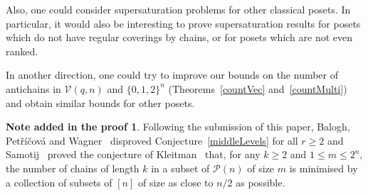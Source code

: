 \documentclass[11 pt]{article}
\theoremstyle{definition}
\newtheorem*{noteAdded}{Note added in the proof}
\theoremstyle{case}
\numberwithin{equation}{section}
\newcommand{\Vectors}[2]{\mathcal{V}\left(#1,#2\right)}
\begin{document}
Also, one could consider supersaturation problems for other classical posets. In particular, it would also be interesting to prove supersaturation results for posets which do not have regular coverings by chains, or for posets which are not even ranked. 

In another direction, one could try to improve our bounds on the number of antichains in $\Vectors{q}{n}$ and $\{0,1,2\}^n$ (Theorems~\ref{countVec} and~\ref{countMulti}) and obtain similar bounds for other posets. 

\begin{noteAdded}
Following the submission of this paper, Balogh, Pet\v{r}\'{i}\v{c}ov\'{a} and Wagner~\cite{BPW} disproved Conjecture~\ref{middleLevels} for all $r\geq2$ and Samotij~\cite{SamotijKleit} proved the conjecture of Kleitman~\cite{superKleitman} that, for any $k\geq2$ and $1\leq m\leq 2^n$, the number of chains of length $k$ in a subset of $\mathcal{P}(n)$ of size $m$ is minimised by a collection of subsets of $[n]$ of size as close to $n/2$ as possible. 
\end{noteAdded}

  
  
\end{document}
